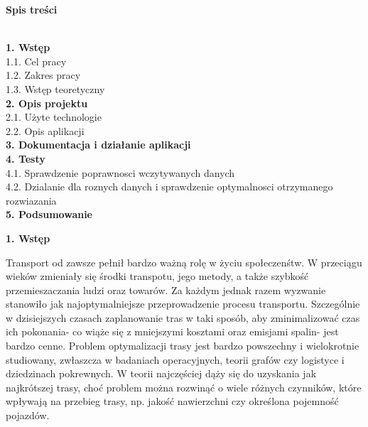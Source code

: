 \documentclass[a4paper, twoside, 12pt, justified]{article}
\begin{document}
	\begin{flushleft}
		\begin{large}\textbf{Spis treści}\end{large}
		\textbf{
			\\1. Wstęp }\\
			\hspace{5mm}1.1. Cel pracy\\
			\hspace{5mm}1.2. Zakres pracy\\
			\hspace{5mm}1.3. Wstęp teoretyczny\\
			\textbf{2. Opis projektu}\\
			\hspace{5mm}2.1. Użyte technologie\\
			\hspace{5mm}2.2. Opis aplikacji\\
			\textbf{3. Dokumentacja i działanie aplikacji}\\
			\textbf{4. Testy}\\
			\hspace{5mm}4.1. Sprawdzenie poprawnosci wczytywanych danych\\
			\hspace{5mm}4.2. Dzialanie dla roznych danych i sprawdzenie optymalnosci otrzymanego rozwiazania\\
			\textbf{5. Podsumowanie}\\
		
	\end{flushleft}
	\newpage
	
		
	\begin{flushleft}
		\begin{large}
			\textbf{1. Wstęp }
		\end{large}
	\end{flushleft}
	\vspace{5mm} %
	
	Transport od zawsze pełnił bardzo ważną rolę w życiu społeczenśtw. W przeciągu wieków zmieniały się środki transpotu, jego metody, a także szybkość przemieszaczania ludzi oraz towarów. Za każdym jednak razem wyzwanie stanowiło jak najoptymalniejsze przeprowadzenie procesu transportu.
	Szczególnie w dzisiejszych czasach zaplanowanie tras w taki sposób, aby zminimalizować czas ich pokonania- co wiąże się z mniejszymi kosztami oraz emisjami spalin- jest bardzo cenne.
	Problem optymalizacji trasy jest bardzo powszechny i wielokrotnie studiowany, zwłaszcza w badaniach operacyjnych, teorii grafów czy logistyce i dziedzinach pokrewnych. W teorii najczęściej dąży się do uzyskania jak najkrótszej trasy, choć problem można rozwinąć o wiele różnych czynników, które wpływają na przebieg trasy, np. jakość nawierzchni czy określona pojemność pojazdów.
	\vspace{5mm} %
	
\end{document}
